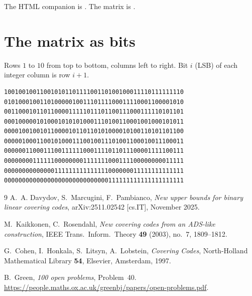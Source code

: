\documentclass[11pt,a4paper]{article}
\theoremstyle{remark}
\begin{document}
The HTML companion is
\href{https://github.com/wustep/maths/blob/main/problems/covering/explainer.html}{}.
The matrix is
\href{https://github.com/wustep/maths/blob/main/problems/covering/result/data/H_r10_n50.txt}{}.

\appendix
\section{The matrix as bits}

Rows $1$ to $10$ from top to bottom, columns left to right. Bit $i$
(LSB) of each integer column is row $i+1$.

{\small
\begin{verbatim}
10010010011001010110111100110100100011110111111110
01010001001101000001001110111100011110001100001010
00110001011011000011111011101100111000111110101101
00010000010100010101010001110100110001001000101011
00001001001011000010110110101000010100110101101100
00000100011001010001110010011101001100010011100011
00000011000111001111110001111011011100001111100111
00000000111111000000001111111000111100000000011111
00000000000000111111111111111000000011111111111111
00000000000000000000000000000111111111111111111111
\end{verbatim}
}

\begin{thebibliography}{9}
A.~A. Davydov, S.~Marcugini, F.~Pambianco,
\emph{New upper bounds for binary linear covering codes},
arXiv:2511.02542 [cs.IT], November 2025.

M.~Kaikkonen, C.~Rosendahl,
\emph{New covering codes from an ADS-like construction},
IEEE Trans.\ Inform.\ Theory \textbf{49} (2003), no.~7, 1809--1812.

G.~Cohen, I.~Honkala, S.~Litsyn, A.~Lobstein,
\emph{Covering Codes}, North-Holland Mathematical Library \textbf{54},
Elsevier, Amsterdam, 1997.

B.~Green, \emph{100 open problems}, Problem~40.
\url{https://people.maths.ox.ac.uk/greenbj/papers/open-problems.pdf}.
\end{thebibliography}
\end{document}
